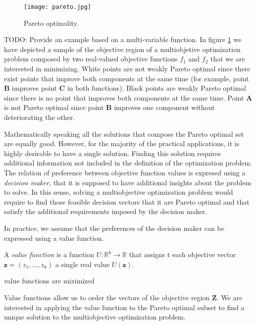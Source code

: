 {\begin{example}
\label{ex:pareto}
\begin{figure}[h]
\centering\texttt{[image: pareto.jpg]}
\caption{\label{fig:pareto}Pareto optimality.}
\end{figure}
{\color{red} TODO: Provide an example based on a multi-variable function.} In figure \ref{fig:pareto} we have depicted a sample of the objective region of a multiobjetive optimization problem composed by two real-valued objective functions $f_1$ and $f_2$ that we are interested in minimizing. White points are not weakly Pareto optimal since there exist points that improve both components at the same time (for example, point $\mathbf{B}$ improves point $\mathbf{C}$ in both functions). Black points are weakly Pareto optimal since there is no point that improves both components at the same time. Point $\mathbf{A}$ is not Pareto optimal since point $\mathbf{B}$ improves one component without deteriorating the other.
\end{example}

Mathematically speaking all the solutions that compose the Pareto optimal set are equally good. However, for the majority of the practical applications, it is highly desirable to have a single solution. Finding this solution requires additional information not included in the definition of the optimization problem. The relation of preference between objective function values is expresed using a \emph{decision maker}, that it is supposed to have additional insights about the problem to solve. In this sense, solving a multiobjective optimization problem would require to find those feasible decision vectors that it are Pareto optimal and that satisfy the additional requirements imposed by the decision maker.

In practice, we assume that the preferences of the decision maker can be expressed using a value function.

\begin{definition}
A \emph{value function} is a function $U : \mathbb{R}^k \rightarrow \mathbb{R}$ that assigns t each objective vector $\mathbf{z} = \left( z_1, \ldots, z_k \right)$ a single real value $U(\mathbf{z})$.
\end{definition}

{\color{red} value functions are miximized}

Value functions allow us to order the vectors of the objective region $\mathbf{Z}$. We are interested in applying the value function to the Pareto optimal subset to find a unique solution to the multiobjective optimization problem.

}
